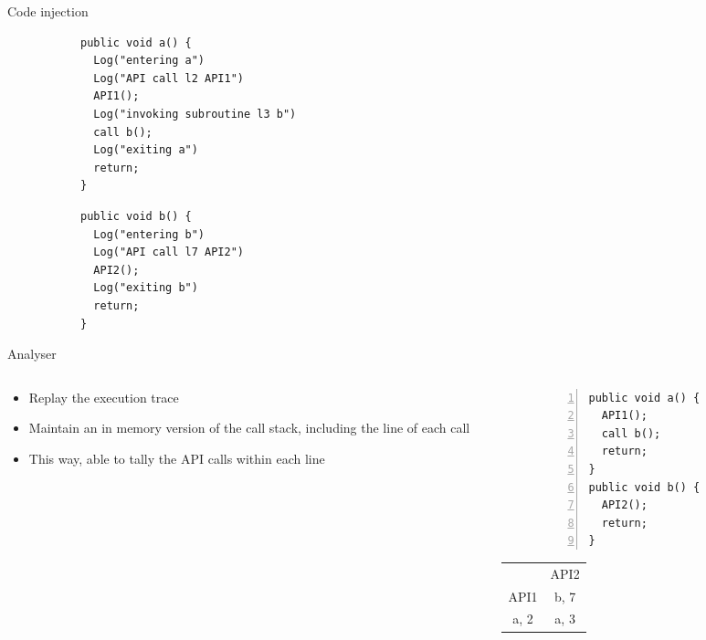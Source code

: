 \begin{frame}[fragile]{Code injection}
\begin{figure}
\caption{Injected functions}
\centering
\begin{subfigure}[t]{0.49\textwidth}
\centering
\begin{lstlisting}
public void a() {
  Log("entering a")
  Log("API call l2 API1")
  API1();
  Log("invoking subroutine l3 b")
  call b();
  Log("exiting a")
  return;
}
\end{lstlisting}
\end{subfigure}
%
\begin{subfigure}[t]{0.49\textwidth}
\centering
\begin{lstlisting}
public void b() {
  Log("entering b")
  Log("API call l7 API2")
  API2();
  Log("exiting b")
  return;
}
\end{lstlisting}
\end{subfigure}
\end{figure}
\end{frame} 
%
%
\begin{frame}[fragile]{Analyser} %
\begin{columns}
%
\begin{column}{0.5\textwidth}
\begin{itemize}
\item Replay the execution trace
\item Maintain an in memory version of the call stack, including the line of each call
\item This way, able to tally the API calls within each line
\end{itemize}
\end{column}
%
\begin{column}{0.4\textwidth}
\begin{figure}%
\centering
\begin{lstlisting}[numbers=left]
public void a() {
  API1();
  call b();
  return;
}
public void b() {
  API2();
  return;
}
\end{lstlisting}
\end{figure}
\begin{tabular}{c | c}
   & API2 \\
   API1 &  b, 7\\
  a, 2 & a, 3 
\end{tabular}
\end{column}
\end{columns}
\note{
}
\end{frame}  
